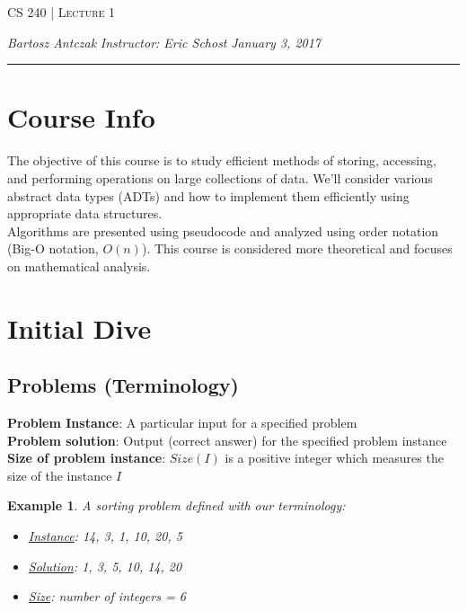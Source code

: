\documentclass{report}
\newcommand{\lectureNum}{1}
\newcommand{\curDate}{January 3, 2017}
\newcommand{\course}{CS 240}
\newtheorem{ex}{Example}[section]
\begin{document}
\begin{center}
\begin{Large}
\textsc{\course{} | Lecture \lectureNum{}}
\end{Large}
\end{center} 
\noindent \textit{Bartosz Antczak} \hfill
\textit{Instructor: Eric Schost} \hfill
\textit{\curDate{}}
\rule{\textwidth}{0.4pt}
\section{Course Info}
The objective of this course is to study efficient methods of storing, accessing, and performing operations on large collections of data. We'll consider various abstract data types (ADTs) and how to implement them efficiently using appropriate data structures. \\
Algorithms are presented using pseudocode and analyzed using order notation (Big-O notation, $O(n)$). This course is considered more theoretical and focuses on mathematical analysis.
\section{Initial Dive}
\subsection{Problems (Terminology)}
\textbf{Problem Instance}: A particular input for a specified problem\\
\textbf{Problem solution}: Output (correct answer) for the specified problem instance\\
\textbf{Size of problem instance}: $Size(I)$ is a positive integer which measures the size of the instance $I$
\begin{ex}
A sorting problem defined with our terminology:
\begin{itemize}
\item \underline{Instance}: 14, 3, 1, 10, 20, 5
\item \underline{Solution}: 1, 3, 5, 10, 14, 20
\item \underline{Size}: number of integers = 6
\end{itemize}
\end{ex}
\end{document}
